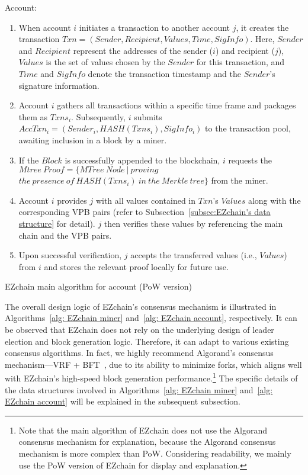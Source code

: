 \documentclass[conference]{IEEEtran}
\begin{document}
\begin{algorithm}[htp!]
  \SetAlgoLined
Account:
\begin{enumerate}
    \item When account $i$ initiates a transaction to another account $j$, it creates the transaction $Txn = (Sender, Recipient, Values, Time, SigInfo)$. Here, $Sender$ and $Recipient$ represent the addresses of the sender ($i$) and recipient ($j$), $Values$ is the set of values chosen by the $Sender$ for this transaction, and $Time$ and $SigInfo$ denote the transaction timestamp and the $Sender$'s signature information.
    \item Account $i$ gathers all transactions within a specific time frame and packages them as $Txns_i$. Subsequently, $i$ submits $AccTxn_i = (Sender_i, HASH(Txns_i), SigInfo_i)$ to the transaction pool, awaiting inclusion in a block by a miner.
    \item If the $Block$ is successfully appended to the blockchain, $i$ requests the $Mtree~Proof = \{MTree~Node~|~proving$ $the~presence~of~HASH(Txns_i)~in~the~Merkle~tree\}$ from the miner.
    \item Account $i$ provides $j$ with all values contained in $Txn$'s $Values$ along with the corresponding VPB pairs (refer to Subsection~\ref{subsec:EZchain's data structure} for detail). $j$ then verifies these values by referencing the main chain and the VPB pairs.
    \item Upon successful verification, $j$ accepts the transferred values (i.e., $Values$) from $i$ and stores the relevant proof locally for future use.
\end{enumerate}
  \caption{EZchain main algorithm for account (PoW version)}
  \label{alg: EZchain account}
\end{algorithm}

The overall design logic of EZchain's consensus mechanism is illustrated in Algorithms~\ref{alg: EZchain miner} and~\ref{alg: EZchain account}, respectively. It can be observed that EZchain does not rely on the underlying design of leader election and block generation logic. Therefore, it can adapt to various existing consensus algorithms. In fact, we highly recommend Algorand's consensus mechanism---VRF + BFT~\cite{Algorand}, due to its ability to minimize forks, which aligns well with EZchain's high-speed block generation performance.\footnote{Note that the main algorithm of EZchain does not use the Algorand consensus mechanism for explanation, because the Algorand consensus mechanism is more complex than PoW. Considering readability, we mainly use the PoW version of EZchain for display and explanation.} The specific details of the data structures involved in Algorithms~\ref{alg: EZchain miner} and~\ref{alg: EZchain account} will be explained in the subsequent subsection.
\end{document}
